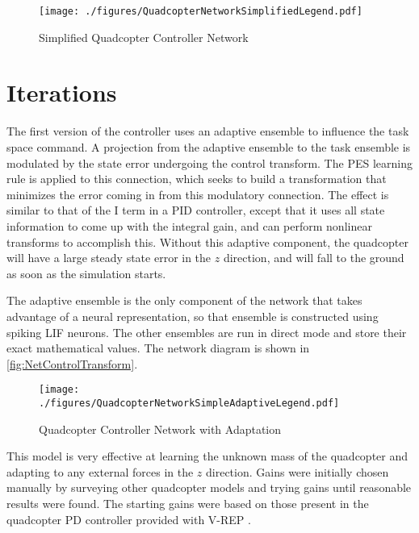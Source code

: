 \documentclass[letterpaper,12pt,titlepage,oneside,final]{book}
\begin{document}
\begin{figure}
\centering
\texttt{[image: ./figures/QuadcopterNetworkSimplifiedLegend.pdf]} %
\caption{Simplified Quadcopter Controller Network}
\label{fig:NetSimplified}
\end{figure}

\section{Iterations}


The first version of the controller uses an adaptive ensemble to influence the task space command. 
A projection from the adaptive ensemble to the task ensemble is modulated by the state error undergoing the control transform. 
The PES learning rule is applied to this connection, which seeks to build a transformation that minimizes the error coming in from this modulatory connection. 
The effect is similar to that of the I term in a PID controller, except that it uses all state information to come up with the integral gain, and can perform nonlinear transforms to accomplish this. 
Without this adaptive component, the quadcopter will have a large steady state error in the $z$ direction, and will fall to the ground as soon as the simulation starts.

The adaptive ensemble is the only component of the network that takes advantage of a neural representation, so that ensemble is constructed using spiking LIF neurons. The other ensembles are run in direct mode and store their exact mathematical values.
The network diagram is shown in \autoref{fig:NetControlTransform}.

\begin{figure}
\centering
\texttt{[image: ./figures/QuadcopterNetworkSimpleAdaptiveLegend.pdf]} %
\caption{Quadcopter Controller Network with Adaptation}
\label{fig:NetControlTransform}

\end{figure}

This model is very effective at learning the unknown mass of the quadcopter and adapting to any external forces in the $z$ direction. 
Gains were initially chosen manually by surveying other quadcopter models and trying gains until reasonable results were found. %
The starting gains were based on those present in the quadcopter PD controller provided with V-REP \cite{vrep}.
\end{document}
